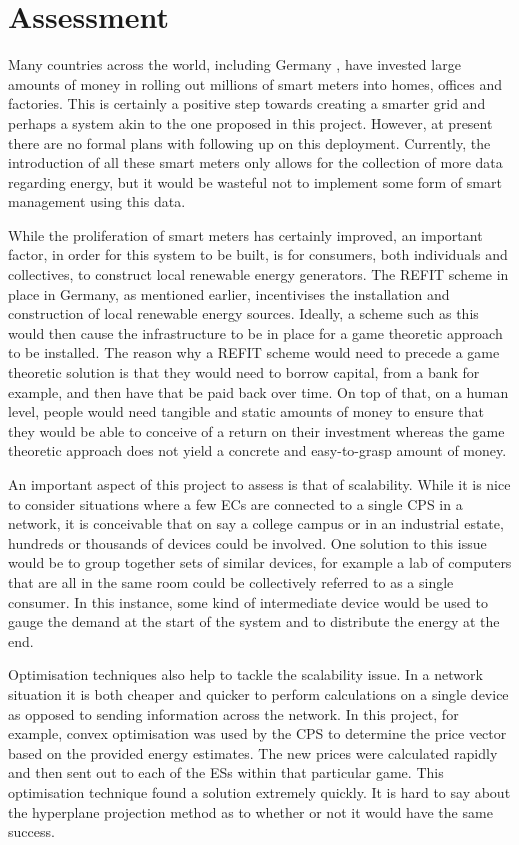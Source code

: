 \documentclass[a4paper, notitlepage]{report}
\begin{document}
\chapter{Assessment}
\label{sec:org47e29cb}
Many countries across the world, including Germany \cite{smartmetersgermany}, have
invested large amounts of money in rolling out millions of smart meters into
homes, offices and factories. This is certainly a positive step towards creating
a smarter grid and perhaps a system akin to the one proposed in this project.
However, at present there are no formal plans with following up on this
deployment. Currently, the introduction of all these smart meters only allows
for the collection of more data regarding energy, but it would be wasteful not
to implement some form of smart management using this data.

While the proliferation of smart meters has certainly improved, an important
factor, in order for this system to be built, is for consumers, both individuals
and collectives, to construct local renewable energy generators. The REFIT
scheme in place in Germany, as mentioned earlier, incentivises the installation
and construction of local renewable energy sources. Ideally, a scheme such as
this would then cause the infrastructure to be in place for a game theoretic
approach to be installed. The reason why a REFIT scheme would need to precede a
game theoretic solution is that they would need to borrow capital, from a bank
for example, and then have that be paid back over time. On top of that, on a
human level, people would need tangible and static amounts of money to ensure
that they would be able to conceive of a return on their investment whereas the
game theoretic approach does not yield a concrete and easy-to-grasp amount of
money.

An important aspect of this project to assess is that of scalability. While it
is nice to consider situations where a few ECs are connected to a single CPS in
a network, it is conceivable that on say a college campus or in an industrial
estate, hundreds or thousands of devices could be involved. One solution to this
issue would be to group together sets of similar devices, for example a lab of
computers that are all in the same room could be collectively referred to as a
single consumer. In this instance, some kind of intermediate device would be
used to gauge the demand at the start of the system and to distribute the energy
at the end.

Optimisation techniques also help to tackle the scalability issue. In a network
situation it is both cheaper and quicker to perform calculations on a single
device as opposed to sending information across the network. In this project,
for example, convex optimisation was used by the CPS to determine the price
vector based on the provided energy estimates. The new prices were calculated
rapidly and then sent out to each of the ESs within that particular game. This
optimisation technique found a solution extremely quickly. It is hard to say
about the hyperplane projection method as to whether or not it would have the
same success.
\end{document}
